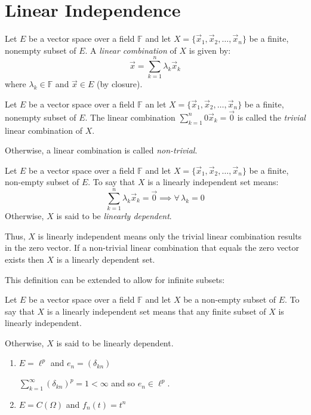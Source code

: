 \documentclass[letterpaper,12pt,fleqn]{article}
\renewcommand{\l}{\lambda}
\renewcommand{\O}{\Omega}
\newcommand{\F}{\mathbb{F}}
\newcommand{\vx}{\vec{x}}
\newcommand{\vo}{\vec{0}}
\begin{document}
\section*{Linear Independence}

\begin{definition}
  Let $E$ be a vector space over a field $\F$ and let
  $X=\{\vx_1,\vx_2,\ldots,\vx_n\}$ be a finite, nonempty subset of $E$. A
  \emph{linear combination} of $X$ is given by:
  \[\vx=\sum_{k=1}^n\l_k\vx_k\]
  where $\l_k\in\F$ and $\vx\in E$ (by closure).
\end{definition}

\begin{definition}[Trivial]
  Let $E$ be a vector space over a field $\F$ an let
  $X=\{\vx_1,\vx_2,\ldots,\vx_n\}$ be a finite, nonempty subset of $E$. The
  linear combination $\sum_{k=1}^n0\vx_k=\vo$ is called the \emph{trivial}
  linear combination of $X$.

  Otherwise, a linear combination is called \emph{non-trivial}.
\end{definition}

\begin{definition}
  Let $E$ be a vector space over a field $\F$ and let
  $X=\{\vx_1,\vx_2,\ldots,\vx_n\}$ be a finite, non-empty subset of $E$. To say
  that $X$ is a linearly independent set means:
  \[\sum_{k=1}^n\l_k\vx_k=\vo\implies\forall\,\l_k=0\]
  Otherwise, $X$ is said to be \emph{linearly dependent}.

  Thus, $X$ is linearly independent means only the trivial linear combination
  results in the zero vector. If a non-trivial linear combination that equals
  the zero vector exists then $X$ is a linearly dependent set.
\end{definition}

This definition can be extended to allow for infinite subsets:

\begin{definition}
  Let $E$ be a vector space over a field $\F$ and let $X$ be a non-empty subset
  of $E$. To say that $X$ is a linearly independent set means that any finite
  subset of $X$ is linearly independent.

  Otherwise, $X$ is said to be linearly dependent.
\end{definition}

\begin{examples}
  \listbreak
  \begin{enumerate}
  \item $E=\ell^p$ and $e_n=(\delta_{kn})$

    $\sum_{k=1}^{\infty}(\delta_{kn})^p=1<\infty$ and so $e_n\in\ell^p$.

  \item $E=C(\O)$ and $f_n(t)=t^n$
  \end{enumerate}
\end{examples}
\end{document}
